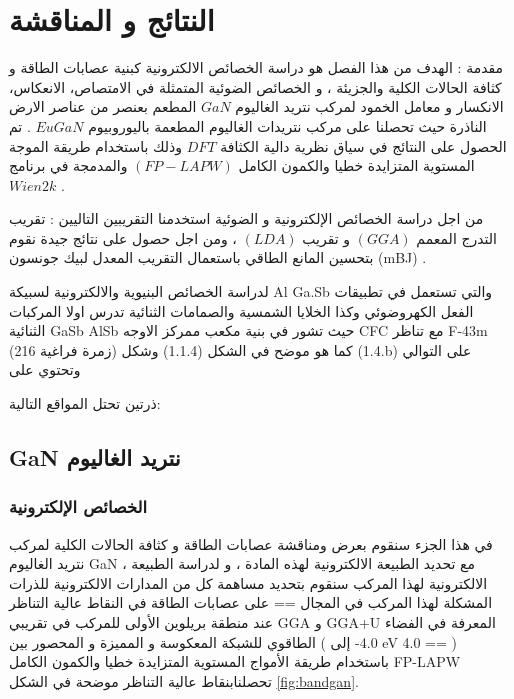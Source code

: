 \chapter{النتائج و المناقشة } %

\label{Chapter3} %

مقدمة :
الهدف من هذا الفصل هو دراسة الخصائص الالكترونية كبنية عصابات الطاقة و كثافة الحالات الكلية والجزيئة ، و الخصائص الضوئية المتمثلة في الامتصاص، الانعكاس، الانكسار و معامل الخمود لمركب نتريد الغاليوم $ GaN $ المطعم بعنصر  من عناصر الارض الناذرة   حيث تحصلنا على مركب نتريدات الغاليوم المطعمة باليوروبيوم $ EuGaN $ . تم الحصول على النتائج في سياق نظرية دالية الكثافة $ DFT $ وذلك باستخدام طريقة الموجة المستوية المتزايدة خطيا والكمون الكامل $ (FP-LAPW) $ والمدمجة في برنامج $ Wien2k $ .

من اجل دراسة الخصائص الإلكترونية و الضوئية استخدمنا التقريبين التاليين : تقريب التدرج المعمم $ (GGA) $ و تقريب $ (LDA) $ ، ومن اجل حصول على نتائج جيدة نقوم بتحسين المانع الطاقي باستعمال التقريب المعدل لبيك جونسون (mBJ)  .

لدراسة الخصائص البنيوية والالكترونية لسبيكة Al Ga.Sb والتي تستعمل في تطبيقات الفعل الكهروضوئي وكذا الخلايا الشمسية والصمامات الثنائية تدرس اولا المركبات الثنائية GaSb AlSb حيث تشور في بنية مكعب ممركز الاوجه CFC مع تناظر F-43m (زمرة فراغية 216) كما هو موضح في الشكل (1.1.4) وشكل (1.4.b) على التوالي وتحتوي على

ذرتين تحتل المواقع التالية:

\section{GaN نتريد الغاليوم }
\subsection{الخصائص الإلكترونية }

في هذا الجزء سنقوم بعرض ومناقشة عصابات الطاقة و كثافة الحالات الكلية لمركب نتريد الغاليوم GaN ، مع تحديد الطبيعة الالكترونية لهذه المادة ، و لدراسة الطبيعة الالكترونية لهذا المركب سنقوم بتحديد مساهمة كل من المدارات الالكترونية للذرات المشكلة لهذا المركب في المجال == على عصابات الطاقة في النقاط عالية التناظر عند منطقة بريلوين الأولى للمركب في تقريبي GGA و GGA+U المعرفة في الفضاء الطاقوي للشبكة المعكوسة و المميزة و المحصور بين ( 4.0- إلى eV 4.0 == ) 
باستخدام طريقة الأمواج المستوية المتزايدة خطيا والكمون الكامل FP-LAPW تحصلنابنقاط عالية التناظر موضحة في الشكل \ref{fig:bandgan}.

